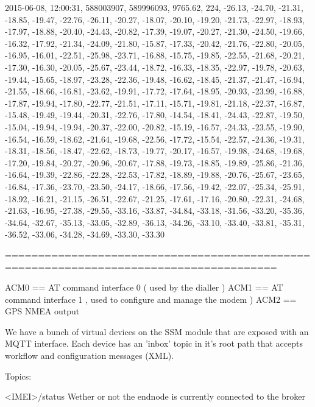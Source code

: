 2015-06-08, 12:00:31, 588003907, 589996093, 9765.62, 224, -26.13, -24.70, -21.31, -18.85, -19.47, -22.76, -26.11, -20.27, -18.07, -20.10, -19.20, -21.73, -22.97, -18.93, -17.97, -18.88, -20.40, -24.43, -20.82, -17.39, -19.07, -20.27, -21.30, -24.50, -19.66, -16.32, -17.92, -21.34, -24.09, -21.80, -15.87, -17.33, -20.42, -21.76, -22.80, -20.05, -16.95, -16.01, -22.51, -25.98, -23.71, -16.88, -15.75, -19.85, -22.55, -21.68, -20.21, -17.30, -16.30, -20.05, -25.67, -23.44, -18.72, -16.33, -18.35, -22.97, -19.78, -20.63, -19.44, -15.65, -18.97, -23.28, -22.36, -19.48, -16.62, -18.45, -21.37, -21.47, -16.94, -21.55, -18.66, -16.81, -23.62, -19.91, -17.72, -17.64, -18.95, -20.93, -23.99, -16.88, -17.87, -19.94, -17.80, -22.77, -21.51, -17.11, -15.71, -19.81, -21.18, -22.37, -16.87, -15.48, -19.49, -19.44, -20.31, -22.76, -17.80, -14.54, -18.41, -24.43, -22.87, -19.50, -15.04, -19.94, -19.94, -20.37, -22.00, -20.82, -15.19, -16.57, -24.33, -23.55, -19.90, -16.54, -16.59, -18.62, -21.64, -19.68, -22.56, -17.72, -15.54, -22.57, -24.36, -19.31, -18.31, -18.56, -18.47, -22.62, -18.73, -19.77, -20.17, -16.57, -19.98, -24.68, -19.68, -17.20, -19.84, -20.27, -20.96, -20.67, -17.88, -19.73, -18.85, -19.89, -25.86, -21.36, -16.64, -19.39, -22.86, -22.28, -22.53, -17.82, -18.89, -19.88, -20.76, -25.67, -23.65, -16.84, -17.36, -23.70, -23.50, -24.17, -18.66, -17.56, -19.42, -22.07, -25.34, -25.91, -18.92, -16.21, -21.15, -26.51, -22.67, -21.25, -17.61, -17.16, -20.80, -22.31, -24.68, -21.63, -16.95, -27.38, -29.55, -33.16, -33.87, -34.84, -33.18, -31.56, -33.20, -35.36, -34.64, -32.67, -35.13, -33.05, -32.89, -36.13, -34.26, -33.10, -33.40, -33.81, -35.31, -36.52, -33.06, -34.28, -34.69, -33.30, -33.30

=======================================================================================


ACM0 == AT command interface 0 ( used by the dialler )
ACM1 == AT command interface 1 , used to configure and manage the modem )
ACM2 == GPS NMEA output



We have a bunch of virtual devices on the SSM module that are exposed with an
MQTT interface. Each device has an 'inbox' topic in it's root path that accepts
workflow and configuration messages (XML).

Topics:

<IMEI>/status
Wether or not the endnode is currently connected to the broker




    
    
    